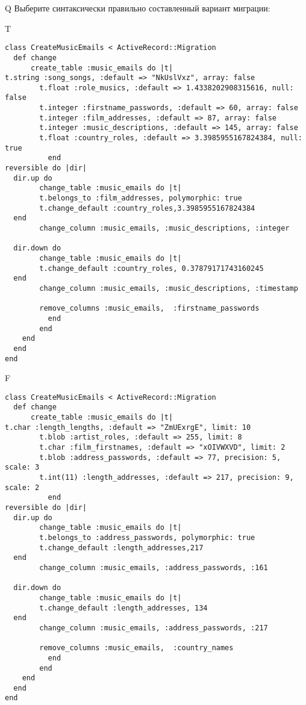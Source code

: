 Q
Выберите синтаксически правильно составленный вариант миграции:

T
\begin{verbatim}
class CreateMusicEmails < ActiveRecord::Migration
  def change
	  create_table :music_emails do |t|
t.string :song_songs, :default => "NkUslVxz", array: false
		t.float :role_musics, :default => 1.4338202908315616, null: false
		t.integer :firstname_passwords, :default => 60, array: false
		t.integer :film_addresses, :default => 87, array: false
		t.integer :music_descriptions, :default => 145, array: false
		t.float :country_roles, :default => 3.3985955167824384, null: true
		  end
reversible do |dir|
  dir.up do
		change_table :music_emails do |t|
		t.belongs_to :film_addresses, polymorphic: true
 		t.change_default :country_roles,3.3985955167824384
  end
 		change_column :music_emails, :music_descriptions, :integer
   
  dir.down do
		change_table :music_emails do |t|
		t.change_default :country_roles, 0.37879171743160245
  end
 		change_column :music_emails, :music_descriptions, :timestamp
   
		remove_columns :music_emails,  :firstname_passwords 
	      end
	    end
    end 
  end
end

\end{verbatim}

F
\begin{verbatim}
class CreateMusicEmails < ActiveRecord::Migration
  def change
	  create_table :music_emails do |t|
t.char :length_lengths, :default => "ZmUExrgE", limit: 10
		t.blob :artist_roles, :default => 255, limit: 8
		t.char :film_firstnames, :default => "xOIVWXVD", limit: 2
		t.blob :address_passwords, :default => 77, precision: 5, scale: 3
		t.int(11) :length_addresses, :default => 217, precision: 9, scale: 2
		  end
reversible do |dir|
  dir.up do
		change_table :music_emails do |t|
		t.belongs_to :address_passwords, polymorphic: true
 		t.change_default :length_addresses,217
  end
 		change_column :music_emails, :address_passwords, :161
   
  dir.down do
		change_table :music_emails do |t|
		t.change_default :length_addresses, 134
  end
 		change_column :music_emails, :address_passwords, :217
   
		remove_columns :music_emails,  :country_names 
	      end
	    end
    end 
  end
end

\end{verbatim}

